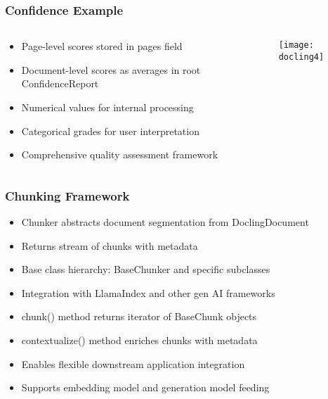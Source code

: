 \begin{frame}[fragile]\frametitle{Confidence Example}
\begin{columns}
    \begin{column}[T]{0.4\linewidth}
      \begin{itemize}
		\item Page-level scores stored in pages field
		\item Document-level scores as averages in root ConfidenceReport
		\item Numerical values for internal processing
		\item Categorical grades for user interpretation
		\item Comprehensive quality assessment framework
	  \end{itemize}

    \end{column}
    \begin{column}[T]{0.6\linewidth}
		\begin{center}
		\texttt{[image: docling4]}
		\end{center}	
    \end{column}
  \end{columns}
\end{frame}

\begin{frame}[fragile]\frametitle{Chunking Framework}
      \begin{itemize}
	\item Chunker abstracts document segmentation from DoclingDocument
	\item Returns stream of chunks with metadata
	\item Base class hierarchy: BaseChunker and specific subclasses
	\item Integration with LlamaIndex and other gen AI frameworks
	\item chunk() method returns iterator of BaseChunk objects
	\item contextualize() method enriches chunks with metadata
	\item Enables flexible downstream application integration
	\item Supports embedding model and generation model feeding
	  \end{itemize}
\end{frame}

